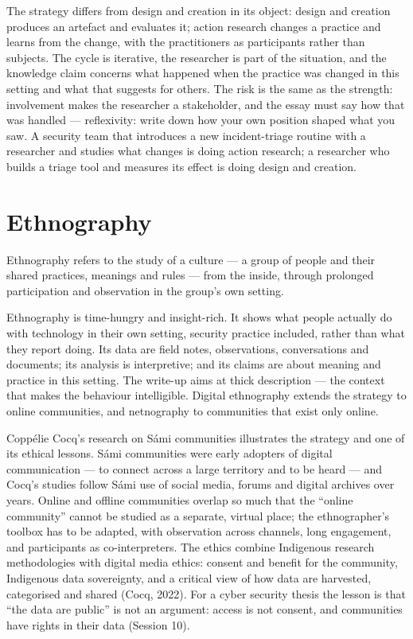 \documentclass[11pt,a4paper,british,twoside=false,headings=small,chapterprefix=false,numbers=noenddot]{scrbook}
\newenvironment{block}[1]{\begin{tcolorbox}[scriptbox, title={#1}]}{\end{tcolorbox}}
\begin{document}
The strategy differs from design and creation in its object: design and creation produces an artefact and evaluates it; action research changes a practice and learns from the change, with the practitioners as participants rather than subjects. The cycle is iterative, the researcher is part of the situation, and the knowledge claim concerns what happened when the practice was changed in this setting and what that suggests for others. The risk is the same as the strength: involvement makes the researcher a stakeholder, and the essay must say how that was handled --- reflexivity: write down how your own position shaped what you saw. A security team that introduces a new incident-triage routine with a researcher and studies what changes is doing action research; a researcher who builds a triage tool and measures its effect is doing design and creation.

\section{Ethnography}

\begin{block}{Ethnography}
Ethnography refers to the study of a culture --- a group of people and their shared practices, meanings and rules --- from the inside, through prolonged participation and observation in the group's own setting.
\end{block}

Ethnography is time-hungry and insight-rich. It shows what people actually do with technology in their own setting, security practice included, rather than what they report doing. Its data are field notes, observations, conversations and documents; its analysis is interpretive; and its claims are about meaning and practice in this setting. The write-up aims at thick description --- the context that makes the behaviour intelligible. Digital ethnography extends the strategy to online communities, and netnography to communities that exist only online.

Coppélie Cocq's research on Sámi communities illustrates the strategy and one of its ethical lessons. Sámi communities were early adopters of digital communication --- to connect across a large territory and to be heard --- and Cocq's studies follow Sámi use of social media, forums and digital archives over years. Online and offline communities overlap so much that the ``online community'' cannot be studied as a separate, virtual place; the ethnographer's toolbox has to be adapted, with observation across channels, long engagement, and participants as co-interpreters. The ethics combine Indigenous research methodologies with digital media ethics: consent and benefit for the community, Indigenous data sovereignty, and a critical view of how data are harvested, categorised and shared (Cocq, 2022). For a cyber security thesis the lesson is that ``the data are public'' is not an argument: access is not consent, and communities have rights in their data (Session 10).
\end{document}
